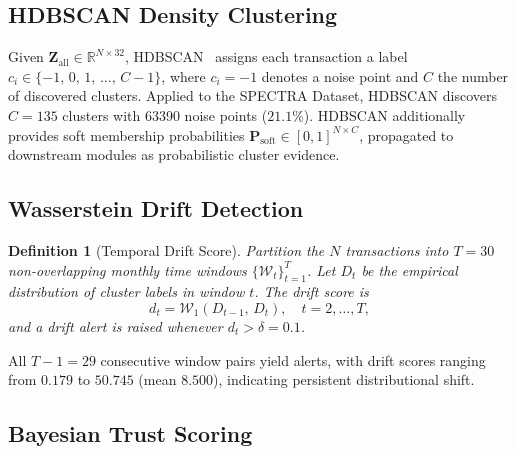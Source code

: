 \documentclass[journal]{IEEEtran}
\newtheorem{definition}{Definition}
\begin{document}
\subsection{HDBSCAN Density Clustering}
\label{subsec:hdbscan_def}

Given $\mathbf{Z}_{\mathrm{all}}\in\mathbb{R}^{N\times 32}$, HDBSCAN~\cite{Campello2013}
assigns each transaction a label
$c_{i} \in \{-1,\,0,\,1,\,\ldots,\,C-1\}$,
where $c_{i}=-1$ denotes a noise point and $C$ the number of discovered
clusters.  Applied to the SPECTRA Dataset, HDBSCAN discovers $C = 135$ clusters with
\num{63390} noise points ($21.1\%$).  HDBSCAN additionally provides soft
membership probabilities
$\mathbf{P}_{\mathrm{soft}} \in [0,1]^{N\times C}$,
propagated to downstream modules as probabilistic cluster evidence.

\subsection{Wasserstein Drift Detection}
\label{subsec:wasserstein_def}

\begin{definition}[Temporal Drift Score]
Partition the $N$ transactions into $T=30$ non-overlapping monthly time
windows $\{\mathcal{W}_{t}\}_{t=1}^{T}$.  Let $D_t$ be the empirical
distribution of cluster labels in window $t$.  The drift score is
\begin{equation}
  d_{t} = \mathcal{W}_{1}(D_{t-1},\, D_{t}),
  \quad t = 2,\ldots,T,
  \label{eq:wasserstein}
\end{equation}
and a drift alert is raised whenever $d_{t} > \delta = 0.1$.
\end{definition}

All $T-1 = 29$ consecutive window pairs yield alerts, with drift scores
ranging from $0.179$ to $50.745$ (mean $8.500$), indicating persistent
distributional shift.

\subsection{Bayesian Trust Scoring}
\label{subsec:trust_def}
\end{document}
